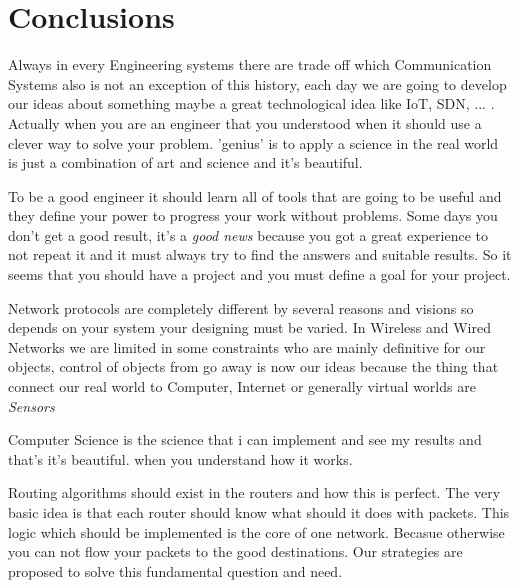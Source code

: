 
\chapter{Conclusions} %

\label{Conclusion} %



Always in every Engineering systems there are trade off which Communication Systems also is not an exception of this history, each day we are going to develop our ideas about something maybe a great technological idea like IoT, SDN, ... . Actually when you are an engineer that you understood when it should use a clever way to solve your problem. 'genius' is to apply a science in the real world is just a combination of art and science and it's beautiful.

To be a good engineer it should learn all of tools that are going to be useful and they define your power to progress your work without problems. Some days you don't get a good result, it's a \textit{good news }because you got a great experience to not repeat it and it must always try to find the answers and suitable results. So it seems that you should have a project and you must define a goal for your project.

Network protocols are completely different by several reasons and visions so depends on your system your designing must be varied. In Wireless and Wired Networks we are limited in some constraints who are mainly definitive for our objects, control of objects from go away is now our ideas because the thing that connect our real world to Computer, Internet or generally virtual worlds are \textit{Sensors}

Computer Science is the science that i can implement and see my results and that's it's beautiful. when you understand how it works.


Routing algorithms should exist in the routers and how this is perfect. The very basic idea is that each router should know what should it does with packets. This logic which should be implemented is the core of one network. Becasue otherwise you can not flow your packets to the good destinations. Our strategies are proposed to solve this fundamental question and need.
     



